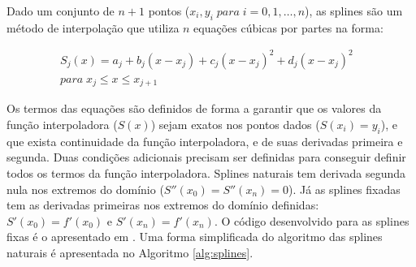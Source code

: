 \documentclass[final,5p]{elsarticle}
\numberwithin{equation}{section}
\begin{document}
        Dado um conjunto de $n+1$ pontos ($x_i,y_i \; para \; i=0,1,\ldots,n$), as splines são um método de interpolação que utiliza $n$ equações cúbicas por partes na forma:
        
        \begin{align*}
            S_j(x) = a_j + b_j (x-x_j) + c_j (x-x_j)^2 + d_j (x-x_j)^2& \\
            para \; x_j \le x \le x_{j+1}&
        \end{align*}
        
        Os termos das equações são definidos de forma a garantir que os valores da função interpoladora ($S(x)$) sejam exatos nos pontos dados ($S(x_i)=y_i$), e que exista continuidade da função interpoladora, e de suas derivadas primeira e segunda. Duas condições adicionais precisam ser definidas para conseguir definir todos os termos da função interpoladora. Splines naturais tem derivada segunda nula nos extremos do domínio ($S''(x_0)=S''(x_n)=0$). Já as splines fixadas tem as derivadas primeiras nos extremos do domínio definidas: $S'(x_0)=f'(x_0)$ e $S'(x_n)=f'(x_n)$. O código desenvolvido para as splines fixas é o apresentado em \cite{burden2016analise}. Uma forma simplificada do algoritmo das splines naturais é apresentada no Algoritmo \ref{alg:splines}. 
\end{document}
